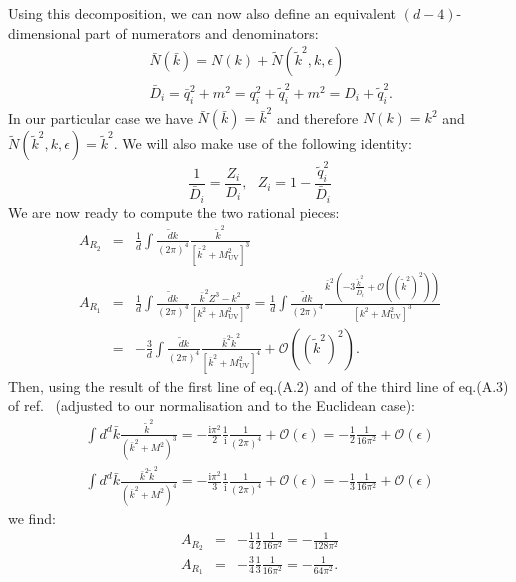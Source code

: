 \documentclass[11pt]{article}
\begin{document}
Using this decomposition, we can now also define an equivalent $(d-4)$-dimensional part of numerators and denominators:
\begin{eqnarray}
&&\bar{N}(\bar{k})=N(k)+\tilde{N}(\tilde{k}^2,k,\epsilon) \nonumber\\
&&\bar{D}_i = \bar{q}_i^2+m^2 = q_i^2+\tilde{q}_i^2+m^2 = D_i + \tilde{q}_i^2.
\end{eqnarray}
In our particular case we have $\bar{N}(\bar{k})=\bar{k}^2$ and therefore $N(k)=k^2$ and $\tilde{N}(\tilde{k}^2,k,\epsilon)=\tilde{k}^2$.
We will also make use of the following identity:
\begin{equation}
\frac{1}{\bar{D}_i}=\frac{Z_i}{D_i},\textrm{  } Z_i=1-\frac{\tilde{q}_i^2}{\bar{D}_i}
\end{equation}
We are now ready to compute the two rational pieces:
\begin{eqnarray}
A_{R_2}&=& \frac{1}{d} \int \frac{\tilde{d} k}{(2\pi)^4} \frac{ \tilde{k}^2 }{\left[ \bar{k}^2+M_\textrm{UV}^2\right]^3} \nonumber \\
A_{R_1} &=& \frac{1}{d} \int \frac{\tilde{d} k}{(2\pi)^4} \frac{ \bar{k}^2 Z^3 - k^2 }{\left[ k^2+M_\textrm{UV}^2\right]^3}
= \frac{1}{d} \int \frac{\tilde{d} k}{(2\pi)^4} \frac{ \bar{k}^2 \left( -3\frac{\tilde{k}^2}{\bar{D}_i} +\mathcal{O}\left((\tilde{k}^2)^2\right) \right) }{\left[ k^2+M_\textrm{UV}^2\right]^3} \nonumber \\
&=&  -\frac{3}{d} \int \frac{\tilde{d} k}{(2\pi)^4} \frac{ \bar{k}^2 \tilde{k}^2 }{\left[ \bar{k}^2+M_\textrm{UV}^2\right]^4} +\mathcal{O}\left((\tilde{k}^2)^2\right).
\end{eqnarray}
Then, using the result of the first line of eq.(A.2) and of the third line of eq.(A.3) of ref.~\cite{Draggiotis:2009yb} (adjusted to our normalisation and to the Euclidean case):
\begin{eqnarray}
\int d^d \bar{k} \frac{\tilde{k}^2}{\left( \bar{k}^2+M^2 \right)^3}=-\frac{\textrm{i}\pi^2}{2}\frac{1}{\textrm{i}}\frac{1}{(2\pi)^4}+\mathcal{O}(\epsilon)=-\frac{1}{2}\frac{1}{16 \pi^2}+\mathcal{O}(\epsilon) \nonumber\\
\int d^d \bar{k} \frac{\bar{k}^2 \tilde{k}^2}{\left( \bar{k}^2+M^2 \right)^4}=-\frac{\textrm{i}\pi^2}{3}\frac{1}{\textrm{i}}\frac{1}{(2\pi)^4}+\mathcal{O}(\epsilon)=-\frac{1}{3}\frac{1}{16 \pi^2}+\mathcal{O}(\epsilon)
\end{eqnarray}
we find:
\begin{eqnarray}
A_{R_2} &=&-\frac{1}{4}\frac{1}{2}\frac{1}{16 \pi^2} = -\frac{1}{128 \pi^2} \nonumber\\
A_{R_1} &=& -\frac{3}{4}\frac{1}{3}\frac{1}{16 \pi^2} = -\frac{1}{64 \pi^2}.
\end{eqnarray}
\end{document}

